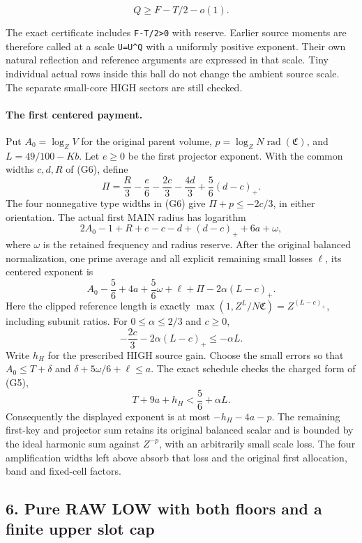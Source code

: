 \[
 Q\ge F-T/2-o(1).
\tag{G8}
\]

The exact certificate includes \texttt{F-T/2\textgreater{}0} with reserve. Earlier source moments are therefore called at a scale \texttt{U\textquotesingle{}=U\^{}Q} with a uniformly positive exponent. Their own natural reflection and reference arguments are expressed in that scale. Tiny individual actual rows inside this ball do not change the ambient source scale. The separate small-core HIGH sectors are still checked.

\paragraph{The first centered payment.}
Put \(A_0=\log_Z V\) for the original parent volume,
\(p=\log_Z N\operatorname{rad}(\mathfrak C)\), and
\(L=49/100-Kb\). Let \(e\ge0\) be the first projector exponent.
With the common widths \(c,d,R\) of (G6), define
\[
 \Pi=\frac R3-\frac e6-\frac{2c}3-\frac{4d}3
       +\frac56(d-c)_+.
\]
The four nonnegative type widths in (G6) give
\(\Pi+p\le-2c/3\), in either orientation.
The actual first MAIN radius has logarithm
\[
 2A_0-1+R+e-c-d+(d-c)_++6a+\omega,
\]
where \(\omega\) is the retained frequency and radius reserve.
After the original balanced normalization, one prime average and
all explicit remaining small losses \(\ell\), its centered exponent is
\[
 A_0-\frac56+4a+\frac56\omega+\ell+\Pi
       -2\alpha(L-c)_+.
\]
Here the clipped reference length is exactly
\(\max(1,Z^L/N\mathfrak C)=Z^{(L-c)_+}\), including subunit ratios.
For \(0\le\alpha\le2/3\) and \(c\ge0\),
\[
 -\frac{2c}3-2\alpha(L-c)_+\le-\alpha L.
\]
Write \(h_H\) for the prescribed HIGH source gain. Choose the
small errors so that \(A_0\le T+\delta\) and
\(\delta+5\omega/6+\ell\le a\). The exact schedule checks the
charged form of (G5),
\[
 T+9a+h_H<\frac56+\alpha L.
\]
Consequently the displayed exponent is at most
\(-h_H-4a-p\). The remaining first-key and projector sum retains
its original balanced scalar and is bounded by the ideal harmonic
sum against \(Z^{-p}\), with an arbitrarily small scale loss.
The four amplification widths left above absorb that loss and the
original first allocation, band and fixed-cell factors.

\hypertarget{sources:pure-raw-low-with-both-floors-and-a-finite-upper-slot-cap}{%
\subsection{6. Pure RAW LOW with both floors and a finite upper slot cap}\label{sources:pure-raw-low-with-both-floors-and-a-finite-upper-slot-cap}}

